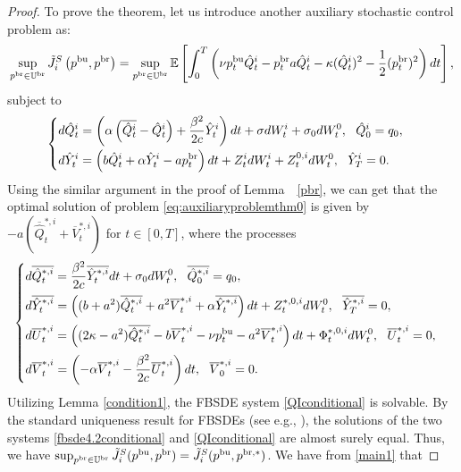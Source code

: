 \documentclass[11pt]{article}
\numberwithin{equation}{section}
\begin{document}
\begin{proof} 
To prove the theorem, let us introduce another auxiliary stochastic control problem as:
\begin{align}\label{eq:auxiliaryproblemthm0}
\sup_{p^{{\rm br}}\in\mathbb{U}^{\rm br}}\tilde{J}_i^S\left(p^{{\rm bu}}, p^{{\rm br}}\right)=\sup_{p^{{\rm br}}\in\mathbb{U}^{\rm br}}\mathbb{E}\left[\int_0^T\left(\nu 
 p_t^{{\rm bu}}\hat{Q}_t^i-p_t^{{\rm br}}a\hat{Q}_t^i-\kappa (\hat{Q}_t^i)^2-\frac{1}{2}(p_t^{{\rm br}})^2\right)dt\right],
\end{align}
subject to 
\begin{align*}
\begin{cases}
\displaystyle d\hat{Q}_t^i=\left(\alpha\left(\overline{\hat{Q}_t^i}-\hat{Q}_t^i\right)+\frac{\beta^2}{2c}\hat{Y}_t^i\right)dt+\sigma dW_t^i+\sigma_0dW_t^0, ~~\hat{Q}_0^i=q_0,\\[0.8em]
 \displaystyle d\hat{Y}_t^i=\left(b\hat{Q}_t^i+\alpha \hat{Y}_t^i- ap_t^{{\rm br}}\right)dt+Z_t^idW_t^i+Z_t^{0,i}dW_t^0,~~\hat{Y}_T^i=0.
\end{cases}
\end{align*}
Using the similar argument in the proof of Lemma~~\ref{pbr}, we can get that the optimal solution of problem \eqref{eq:auxiliaryproblemthm0} is given by $-a(\overline{\hat{Q}}_t^{*,i}+\overline{V}_t^{*,i})$ for $t\in[0,T]$, where the processes 
     \begin{align}\label{QIconditional}
    	\begin{cases}
    		\displaystyle d\overline{\hat{Q}_t^{*,i}}=\frac{\beta^2}{2c}\overline{\hat{Y}_t^{*,i}}dt+\sigma_0dW_t^0, ~~ \overline{\hat{Q}_0^{*,i}}=q_0,\\[0.8em]
    		\displaystyle d\overline{\hat{Y}_t^{*,i}}=\left((b+a^2)\overline{\hat{Q}_t^{*,i}}+a^2\overline{V}_t^{*,i}+\alpha \overline{\hat{Y}_t^{*,i}}\right)dt+Z_t^{*,0,i}dW_t^0,~~ \overline{\hat{Y}_T^{*,i}}=0,\\[0.8em]
    		\displaystyle d\overline{U}_t^{*,i}=\left((2\kappa-a^2) \overline{\hat{Q}_t^{*,i}}-b\overline{V}_t^{*,i}-\nu p_t^{{\rm bu}}-a^2\overline{V}_t^{*,i}\right)dt+\Phi_t^{*,0,i}dW_t^0,~~ \overline{U}_t^{*,i}=0,\\[0.8em]
    		\displaystyle d\overline{V}_t^{*,i}=\left(-\alpha \overline{V}_t^{*,i}-\frac{\beta^2}{2c}\overline{U}_t^{*,i}\right)dt,~~ \overline{V}_0^{*,i}=0.
    	\end{cases}
    \end{align}
Utilizing Lemma \ref{condition1}, the FBSDE system \eqref{QIconditional} is solvable. By the standard uniqueness result for FBSDEs (see e.g., \cite{MY99}), the solutions of the two systems \eqref{fbsde4.2conditional} and \eqref{QIconditional} are almost surely equal. Thus, we have $\sup_{p^{{\rm br}}\in \mathbb{U}^{{\rm br}}}\tilde{J}_i^S(p^{{\rm bu}}, p^{{\rm br}})=\tilde{J}_i^S(p^{{\rm bu}}, p^{{\rm br},*})$.	We have from \eqref{main1} that

\end{proof}
\end{document}
